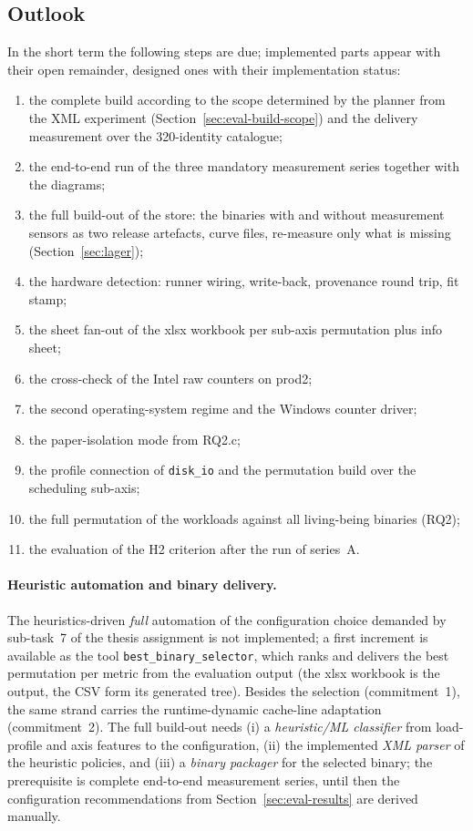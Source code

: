 \begin{nurkurz}
\section{Outlook}\label{sec:outlook}
In the short term the following steps are due; implemented parts appear with their open remainder,
designed ones with their implementation status:
\begin{enumerate}[label=(\arabic*)]
  \item the complete build according to the scope determined by the planner from the XML experiment
  (Section~\ref{sec:eval-build-scope}) and the
  delivery measurement over the 320-identity catalogue;
  \item the end-to-end run of the three mandatory measurement series together with the diagrams;
  \item the full build-out of the store: the binaries with and without measurement sensors as two release
  artefacts, curve files, re-measure only what is missing (Section~\ref{sec:lager});
  \item the hardware detection: runner wiring, write-back, provenance round trip, fit stamp;
  \item the sheet fan-out of the xlsx workbook per sub-axis permutation plus info sheet;
  \item the cross-check of the Intel raw counters on prod2;
  \item the second operating-system regime and the Windows counter driver;
  \item the paper-isolation mode from RQ2.c;
  \item the profile connection of \texttt{disk\_io} and the permutation build over the scheduling
  sub-axis;
  \item the full permutation of the workloads against all living-being binaries (RQ2);
  \item the evaluation of the H2 criterion after the run of series~A\@.
\end{enumerate}

\paragraph{Heuristic automation and binary delivery.} The heuristics-driven \emph{full} automation of the
configuration choice demanded by sub-task~7 of the thesis assignment is not implemented; a first increment
is available as the tool \texttt{best\_binary\_selector}, which ranks and delivers the best permutation
per metric from the evaluation output (the xlsx workbook is the output, the CSV form its generated tree).
Besides the selection (commitment~1), the same strand carries the runtime-dynamic cache-line adaptation
(commitment~2). The full build-out needs (i) a \emph{heuristic/ML classifier} from load-profile and axis
features to the configuration, (ii) the implemented \emph{XML parser} of the heuristic policies, and (iii)
a \emph{binary packager} for the selected binary; the prerequisite is complete end-to-end measurement
series, until then the configuration recommendations from Section~\ref{sec:eval-results} are derived
manually.


\end{nurkurz}
